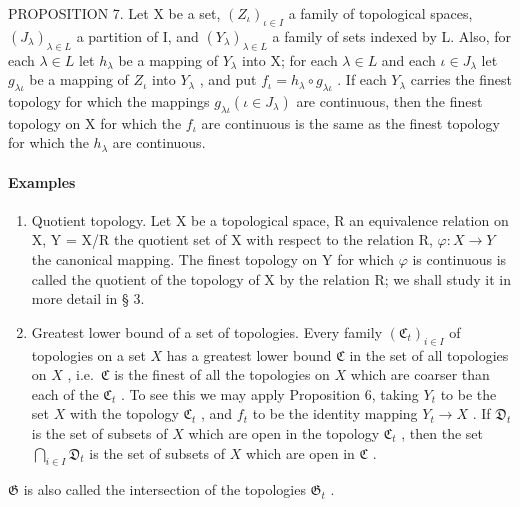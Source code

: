 PROPOSITION 7. Let X be a set, \((Z_{\iota})_{\iota \in I}\) a family of topological spaces, \((J_{\lambda})_{\lambda \in L}\) a partition of I, and \((Y_{\lambda})_{\lambda \in L}\) a family of sets indexed by L. Also, for each \(\lambda \in L\) let \(h_{\lambda}\) be a mapping of \(Y_{\lambda}\) into X; for each \(\lambda \in L\) and each \(\iota \in J_{\lambda}\) let \(g_{\lambda \iota}\) be a mapping of \(Z_{\iota}\) into \(Y_{\lambda}\) , and put \(f_{\iota} = h_{\lambda} \circ g_{\lambda \iota}\) . If each \(Y_{\lambda}\) carries the finest topology for which the mappings \(g_{\lambda \iota} (\iota \in J_{\lambda})\) are continuous, then the finest topology on X for which the \(f_{\iota}\) are continuous is the same as the finest topology for which the \(h_{\lambda}\) are continuous.

\paragraph*{Examples}

\begin{enumerate}
\def\labelenumi{\arabic{enumi})}
\item
  Quotient topology. Let X be a topological space, R an equivalence relation on X, Y = X/R the quotient set of X with respect to the relation R, \(\varphi: X \to Y\) the canonical mapping. The finest topology on Y for which \(\varphi\) is continuous is called the quotient of the topology of X by the relation R; we shall study it in more detail in § 3.
\item
  Greatest lower bound of a set of topologies. Every family \((\mathfrak{C}_t)_{i \in I}\) of topologies on a set \(X\) has a greatest lower bound \(\mathfrak{C}\) in the set of all topologies on \(X\) , i.e.~\(\mathfrak{C}\) is the finest of all the topologies on \(X\) which are coarser than each of the \(\mathfrak{C}_t\) . To see this we may apply Proposition 6, taking \(Y_t\) to be the set \(X\) with the topology \(\mathfrak{C}_t\) , and \(f_t\) to be the identity mapping \(Y_t \to X\) . If \(\mathfrak{D}_t\) is the set of subsets of \(X\) which are open in the topology \(\mathfrak{C}_t\) , then the set \(\bigcap_{i \in I} \mathfrak{D}_t\) is the set of subsets of \(X\) which are open in \(\mathfrak{C}\) .
\end{enumerate}

\(\mathfrak{G}\) is also called the intersection of the topologies \(\mathfrak{G}_{t}\) .

